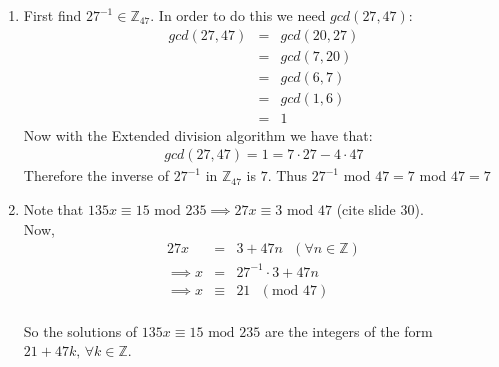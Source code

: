 \begin{enumerate}

\item First find $27^{-1} \in \mathbb{Z}_{47}$. In order to do this we need $gcd(27,47)$:
\begin{eqnarray*}
    gcd(27,47) &=& gcd(20,27) \\
    &=& gcd(7,20) \\
    &=& gcd(6,7) \\
    &=& gcd(1,6) \\
    &=& 1
\end{eqnarray*}
Now with the Extended division algorithm we have that:
\begin{eqnarray*}
    gcd(27,47) = 1 = 7 \cdot 27 - 4 \cdot 47
\end{eqnarray*}
Therefore the inverse of $27^{-1}$ in $\mathbb{Z}_{47}$ is $7$.
Thus $27^{-1}$ mod $47 = 7$ mod $47 = 7$ 

\item Note that $135x \equiv 15 \textrm{ mod } 235 \implies 27x \equiv 3 \textrm{ mod } 47$ (cite slide 30). \\
  Now, \begin{eqnarray*}
    27x &=& 3 + 47n \textrm{ } (\forall n \in \mathbb{Z}) \\
    \implies x &=& 27^{-1} \cdot 3 + 47n \\
    \implies x &\equiv& 21 \textrm{ } (\textrm{mod } 47) \\
  \end{eqnarray*}

So the solutions of $135x \equiv 15 \textrm{ mod } 235$ are the integers of the form $21 + 47k \textrm{, } \forall k \in \mathbb{Z}$.

\end{enumerate}
